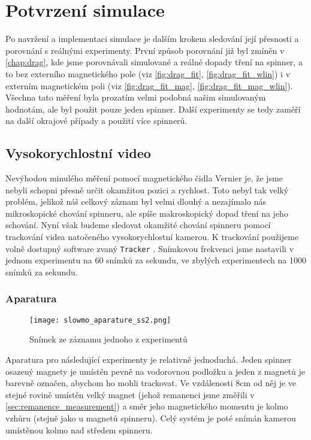 \chapter{Potvrzení simulace}
\label{chap:sim_confirmation}

Po navržení a implementaci simulace je dalším krokem sledování její přesnosti a porovnání s reálnými experimenty. První způsob porovnání již byl zmíněn v \autoref{chap:drag}, kde jsme porovnávali simulované a reálné dopady tření na spinner, a to bez externího magnetického pole (viz \autoref{fig:drag_fit}, \autoref{fig:drag_fit_wlin}) i v externím magnetickém poli (viz \autoref{fig:drag_fit_mag}, \autoref{fig:drag_fit_mag_wlin}). Všechna tato měření byla prozatím velmi podobná našim simulovaným hodnotám, ale byl použit pouze jeden spinner. Další experimenty se tedy zaměří na další okrajové případy a použití více spinnerů.

\section{Vysokorychlostní video}

Nevýhodou minulého měření pomocí magnetického čidla Vernier je, že jsme nebyli schopni přesně určit okamžitou pozici a rychlost. Toto nebyl tak velký problém, jelikož náš celkový záznam byl velmi dlouhý a nezajímalo nás mikroskopické chování spinneru, ale spíše makroskopický dopad tření na jeho schování. Nyní však budeme sledovat okamžité chování spinneru pomocí trackování videa natočeného vysokorychlostní kamerou. K trackování použijeme volně dostupný software zvaný \texttt{Tracker} \cite{Tracker}. Snímkovou frekvenci jsme nastavili v jednom experimentu na 60 snímků za sekundu, ve zbylých experimentech na 1000 snímků za sekundu.

\subsection{Aparatura}

\begin{wrapfigure}{r}{0.40\textwidth}
    \texttt{[image: slowmo\_aparature\_ss2.png]}
    \centering
    \caption{Snímek ze záznamu jednoho z experimentů}
    \label{fig:slowmo_aparature_ss2}
\end{wrapfigure}

Aparatura pro následující experimenty je relativně jednoduchá. Jeden spinner osazený magnety je umístěn pevně na vodorovnou podložku a jeden z magnetů je barevně označen, abychom ho mohli trackovat. Ve vzdálenosti 8cm od něj je ve stejné rovině umístěn velký magnet (jehož remanenci jsme změřili v \autoref{sec:remanence_measurement}) a směr jeho magnetického momentu je kolmo vzhůru (stejně jako u magnetů spinneru). Celý systém je poté snímán kamerou umístěnou kolmo nad středem spinneru.

